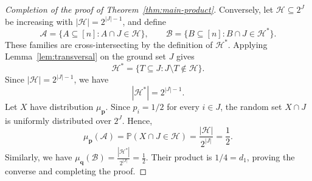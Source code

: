 \documentclass[11pt]{article}
\numberwithin{equation}{section}
\theoremstyle{definition}
\theoremstyle{remark}
\begin{document}
\begin{proof}[Completion of the proof of Theorem~\ref{thm:main-product}]
Conversely, let $\mathcal{H}\subseteq2^J$ be increasing with
$|\mathcal{H}|=2^{|J|-1}$, and define
\begin{equation*}
 \mathcal{A}
 =
 \{A\subseteq[n]:A\cap J\in\mathcal{H}\},
 \qquad
 \mathcal{B}
 =
 \{B\subseteq[n]:B\cap J\in\mathcal{H}^*\}.
\end{equation*}
These families are cross-intersecting by the definition of
$\mathcal{H}^*$.  Applying Lemma~\ref{lem:transversal} on the ground
set $J$ gives
\begin{equation*}
 \mathcal{H}^*
 =
 \{T\subseteq J:J\setminus T\notin\mathcal{H}\}.
\end{equation*}
Since $|\mathcal{H}|=2^{|J|-1}$, we have
\begin{equation*}
 |\mathcal{H}^*|
 =
 2^{|J|-1}.
\end{equation*}
Let $X$ have distribution $\mu_{\mathbf p}$.  Since $p_i=1/2$ for
every $i\in J$, the random set $X\cap J$ is uniformly distributed over
$2^J$.  
Hence,
\[
 \mu_{\mathbf p}(\mathcal{A})
 =
 \mathbb{P}(X\cap J\in\mathcal{H})
 =
 \frac{|\mathcal{H}|}{2^{|J|}}
 =
 \frac12.
\]
Similarly, we have
$
 \mu_{\mathbf q}(\mathcal{B})
 =
 \frac{|\mathcal{H}^*|}{2^{|J|}}
 =
 \frac12.
$
Their product is $1/4=d_1$, proving the converse and completing the
proof.
\end{proof}
\end{document}
